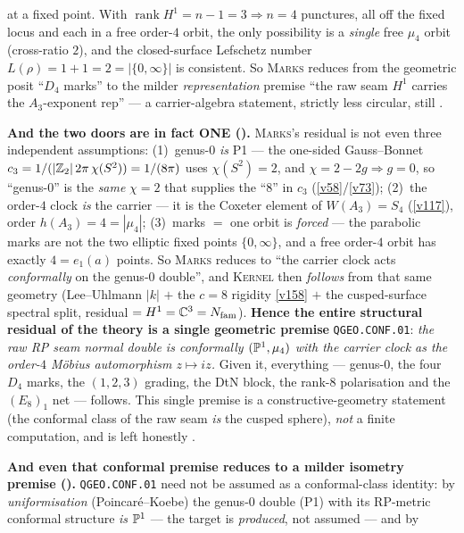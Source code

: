 \begin{keybox}
at a fixed point. With $\operatorname{rank}H^1=n-1=3\Rightarrow n=4$ punctures, all off the fixed locus and
each in a free order-$4$ orbit, the only possibility is a \emph{single} free $\mu_4$ orbit (cross-ratio $2$),
and the closed-surface Lefschetz number $L(\rho)=1+1=2=|\{0,\infty\}|$ is consistent. So \textsc{Marks}
reduces from the geometric posit ``$D_4$ marks'' to the milder \emph{representation} premise ``the raw seam
$H^1$ carries the $A_3$-exponent rep'' --- a carrier-algebra statement, strictly less circular, still \mO.
\par\smallskip\noindent\textbf{And the two doors are in fact ONE
().} \textsc{Marks}'s residual is not even three independent
assumptions: (1)~genus-$0$ \emph{is} P1 --- the one-sided Gauss--Bonnet $c_3=1/(|\mathbb Z_2|\,2\pi\,\chi(S^2))
=1/(8\pi)$ uses $\chi(S^2)=2$, and $\chi=2-2g\Rightarrow g=0$, so ``genus-$0$'' is the \emph{same}
$\chi=2$ that supplies the ``$8$'' in $c_3$ (\vref{v58}/\vref{v73}); (2)~the order-$4$ clock \emph{is}
the carrier --- it is the Coxeter element of $W(A_3)=S_4$ (\vref{v117}), order $h(A_3)=4=|\mu_4|$;
(3)~marks $=$ one orbit is \emph{forced} --- the parabolic marks are not the two elliptic fixed points
$\{0,\infty\}$, and a free order-$4$ orbit has exactly $4=e_1(a)$ points. So \textsc{Marks} reduces to
``the carrier clock acts \emph{conformally} on the genus-$0$ double'', and \textsc{Kernel} then
\emph{follows} from that same geometry (Lee--Uhlmann $|k|$ $+$ the $c=8$ rigidity \vref{v158} $+$ the
cusped-surface spectral split, residual $=H^1=\mathbb C^3=N_{\mathrm{fam}}$). \textbf{Hence the entire structural residual
of the theory is a single geometric premise} \texttt{QGEO.CONF.01}: \emph{the raw RP seam normal double
is conformally $(\mathbb P^1,\mu_4)$ with the carrier clock as the order-$4$ M\"obius automorphism $z\mapsto iz$.}
Given it, everything --- genus-$0$, the four $D_4$ marks, the $(1,2,3)$ grading, the DtN block, the
rank-$8$ polarisation and the $(E_8)_1$ net --- follows. This single premise is a constructive-geometry
statement (the conformal class of the raw seam \emph{is} the cusped sphere), \emph{not} a finite
computation, and is left honestly \mO.
\par\smallskip\noindent\textbf{And even that conformal premise reduces to a milder isometry premise
().} \texttt{QGEO.CONF.01} need not be assumed as a conformal-class
identity: by \emph{uniformisation} (Poincar\'e--Koebe) the genus-$0$ double (P1) with its RP-metric
conformal structure \emph{is} $\mathbb P^1$ --- the target is \emph{produced}, not assumed --- and by

\end{keybox}
